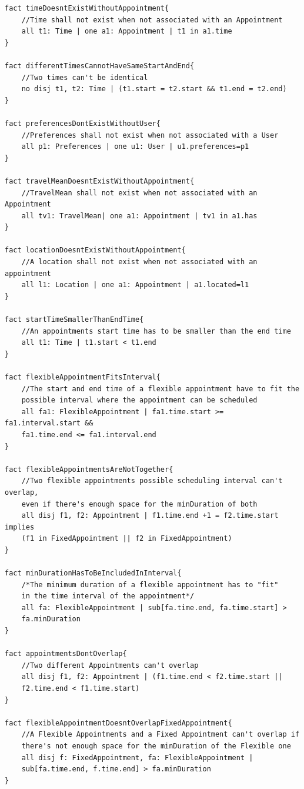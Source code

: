 \documentclass[12pt]{article}
\begin{document}
\begin{verbatim}
fact timeDoesntExistWithoutAppointment{
    //Time shall not exist when not associated with an Appointment
    all t1: Time | one a1: Appointment | t1 in a1.time
}

fact differentTimesCannotHaveSameStartAndEnd{
    //Two times can't be identical 
    no disj t1, t2: Time | (t1.start = t2.start && t1.end = t2.end)
}

fact preferencesDontExistWithoutUser{
    //Preferences shall not exist when not associated with a User
    all p1: Preferences | one u1: User | u1.preferences=p1
}

fact travelMeanDoesntExistWithoutAppointment{
    //TravelMean shall not exist when not associated with an Appointment
    all tv1: TravelMean| one a1: Appointment | tv1 in a1.has
}

fact locationDoesntExistWithoutAppointment{
    //A location shall not exist when not associated with an appointment
    all l1: Location | one a1: Appointment | a1.located=l1
}

fact startTimeSmallerThanEndTime{
    //An appointments start time has to be smaller than the end time
    all t1: Time | t1.start < t1.end
}

fact flexibleAppointmentFitsInterval{
    //The start and end time of a flexible appointment have to fit the
    possible interval where the appointment can be scheduled
    all fa1: FlexibleAppointment | fa1.time.start >= fa1.interval.start &&
    fa1.time.end <= fa1.interval.end
}

fact flexibleAppointmentsAreNotTogether{
    //Two flexible appointments possible scheduling interval can't overlap,
    even if there's enough space for the minDuration of both
    all disj f1, f2: Appointment | f1.time.end +1 = f2.time.start implies 
    (f1 in FixedAppointment || f2 in FixedAppointment)
}

fact minDurationHasToBeIncludedInInterval{
    /*The minimum duration of a flexible appointment has to "fit" 
    in the time interval of the appointment*/
    all fa: FlexibleAppointment | sub[fa.time.end, fa.time.start] > 
    fa.minDuration
}

fact appointmentsDontOverlap{
    //Two different Appointments can't overlap
    all disj f1, f2: Appointment | (f1.time.end < f2.time.start ||
    f2.time.end < f1.time.start)
}

fact flexibleAppointmentDoesntOverlapFixedAppointment{
    //A Flexible Appointments and a Fixed Appointment can't overlap if
    there's not enough space for the minDuration of the Flexible one
    all disj f: FixedAppointment, fa: FlexibleAppointment | 
    sub[fa.time.end, f.time.end] > fa.minDuration
}


\end{verbatim}
\end{document}
